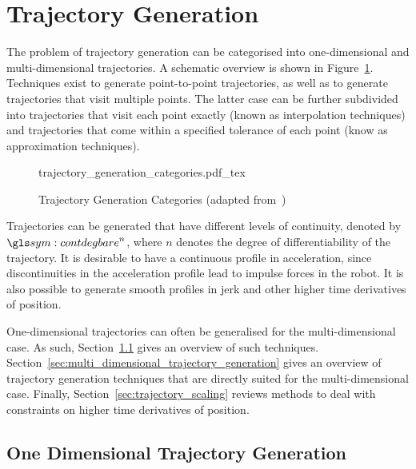 \section{Trajectory Generation}%
\label{sec:trajectory_generation}

	The problem of trajectory generation can be categorised into one-dimensional
	and multi-dimensional trajectories. A schematic overview is shown in
	Figure~\ref{fig:trajectory_generation_categories}. Techniques exist to generate
	point-to-point trajectories, as well as to generate trajectories that visit
	multiple points. The latter case can be further subdivided into trajectories
	that visit each point exactly (known as interpolation techniques) and
	trajectories that come within a specified tolerance of each point (know as
	approximation techniques).

	\begin{figure}[hb]
		\centering
		\def\svgwidth{\columnwidth}
		{trajectory_generation_categories.pdf_tex}
		\caption[Trajectory Generation Categories]
			{Trajectory Generation Categories (adapted
			from~\cite{bib:traj:trajectory_planning_for_automatic_machines_and_robots})}%
		\label{fig:trajectory_generation_categories}
	\end{figure}

	Trajectories can be generated that have different levels of continuity,
	denoted by $\contdeg{n}$, where $n$ denotes the degree of differentiability
	of the trajectory. It is desirable to have a continuous profile in
	acceleration, since discontinuities in the acceleration profile lead to
	impulse forces in the robot. It is also possible to generate smooth profiles
	in jerk and other higher time derivatives of position.

	One-dimensional trajectories can often be generalised for the
	multi-dimensional case. As such,
	Section~\ref{sec:one_dimensional_trajectory_generation} gives an overview of
	such techniques. Section~\ref{sec:multi_dimensional_trajectory_generation}
	gives an overview of trajectory generation techniques that are directly
	suited for the multi-dimensional case. Finally,
	Section~\ref{sec:trajectory_scaling} reviews methods to deal with
	constraints on higher time derivatives of position.

	\subsection{One Dimensional Trajectory Generation}%
	\label{sec:one_dimensional_trajectory_generation}

